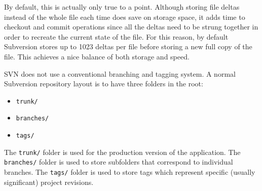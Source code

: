 By default, this is actually only true to a point. Although storing file deltas instead of the whole file each time does save on storage space, it adds time to checkout and commit operations since all the deltas need to be strung together in order to recreate the current state of the file. For this reason, by default Subversion stores up to 1023 deltas per file before storing a new full copy of the file. This achieves a nice balance of both storage and speed.

SVN does not use a conventional branching and tagging system. A normal Subversion repository layout is to have three folders in the root:
\begin{itemize}
    \item \lstinline{trunk/}
    \item \lstinline{branches/}
    \item \lstinline{tags/}
\end{itemize}
The \lstinline{trunk/} folder is used for the production version of the application.
The \lstinline{branches/} folder is used to store subfolders that correspond to individual branches.
The \lstinline{tags/} folder is used to store tags which represent specific (usually significant) project revisions.

